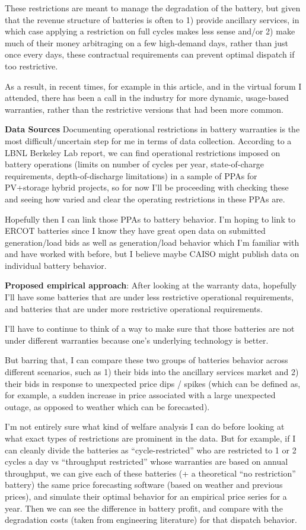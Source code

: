 \documentclass{article}
\begin{document}
These restrictions are meant to manage the degradation of the battery, but given that the revenue structure of batteries is often to 1) provide ancillary services, in which case applying a restriction on full cycles makes less sense and/or 2) make much of their money arbitraging on a few high-demand days, rather than just once every days, these contractual requirements can prevent optimal dispatch if too restrictive. 

As a result, in recent times, for example in this article, and in the virtual forum I attended, there has been a call in the industry for more dynamic, usage-based warranties, rather than the restrictive versions that had been more common. 

\textbf{Data Sources}
Documenting operational restrictions in battery warranties is the most difficult/uncertain step for me in terms of data collection. According to a LBNL Berkeley Lab report, we can find operational restrictions imposed on battery operations (limits on number of cycles per year, state-of-charge requirements, depth-of-discharge limitations) in a sample of PPAs for PV+storage hybrid projects, so for now I’ll be proceeding with checking these and seeing how varied and clear the operating restrictions in these PPAs are. 

Hopefully then I can link those PPAs to battery behavior. I’m hoping to link to ERCOT batteries since I know they have great open data on submitted generation/load bids as well as generation/load behavior which I’m familiar with and have worked with before, but I believe maybe CAISO might publish data on individual battery behavior. 


\textbf{Proposed empirical approach}: 
After looking at the warranty data, hopefully I’ll have some batteries that are under less restrictive operational requirements, and batteries that are under more restrictive operational requirements. 

I’ll have to continue to think of a way to make sure that those batteries are not under different warranties because one’s underlying technology is better. 

But barring that, I can compare these two groups of batteries behavior across different scenarios, such as 1) their bids into the ancillary services market and 2) their bids in response to unexpected price dips / spikes (which can be defined as, for example, a sudden increase in price associated with a large unexpected outage, as opposed to weather which can be forecasted). 

I’m not entirely sure what kind of welfare analysis I can do before looking at what exact types of restrictions are prominent in the data. But for example, if I can cleanly divide the batteries as “cycle-restricted” who are restricted to 1 or 2 cycles a day vs “throughput restricted” whose warranties are based on annual throughput, we can give each of these batteries (+ a theoretical “no restriction” battery) the same price forecasting software (based on weather and previous prices), and simulate their optimal behavior for an empirical price series for a year. Then we can see the difference in battery profit, and compare with the degradation costs (taken from engineering literature) for that dispatch behavior. 
\end{document}
